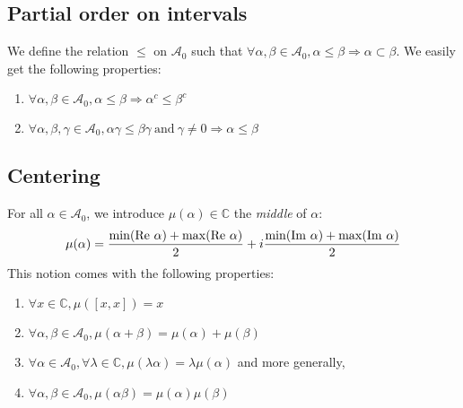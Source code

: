 \subsection{Partial order on intervals}

We define the relation $\le$ on $\mathcal{A}_0$ such that $\forall \alpha, \beta \in \mathcal{A}_0, \alpha \le \beta \Rightarrow \alpha \subset \beta$.
We easily get the following properties:
\begin{enumerate}[i]
    \item $\forall \alpha, \beta \in \mathcal{A}_0, \alpha \le \beta \Rightarrow \alpha^c \le \beta^c$
    \item $\forall \alpha, \beta, \gamma \in \mathcal{A}_0, \alpha \gamma \le \beta \gamma ~\text{and}~ \gamma \not=0 \Rightarrow \alpha \le \beta$
\end{enumerate}

\subsection{Centering}

For all $\alpha \in \mathcal{A}_0$, we introduce $\mu(\alpha) \in \mathbb{C}$ the \textit{middle} of $\alpha$:
$$\mu(\alpha) = \frac{\min(\mathrm{Re}~\alpha) + \max(\mathrm{Re}~\alpha)}{2} + i \frac{\min(\mathrm{Im}~\alpha) + \max(\mathrm{Im}~\alpha)}{2}$$
This notion comes with the following properties:
\begin{enumerate}[i]
    \item $\forall x \in \mathbb{C}, \mu([x, x]) = x$
    \item\label{musum} $\forall \alpha, \beta \in \mathcal{A}_0, \mu(\alpha + \beta) = \mu(\alpha) + \mu(\beta)$
    \item \label{muscalarprod}$\forall \alpha \in \mathcal{A}_0, \forall \lambda \in \mathbb{C}, \mu(\lambda \alpha) = \lambda \mu(\alpha)$ and more generally,
    \item $\forall \alpha, \beta \in \mathcal{A}_0, \mu(\alpha \beta) = \mu(\alpha) \mu(\beta)$
\end{enumerate}

